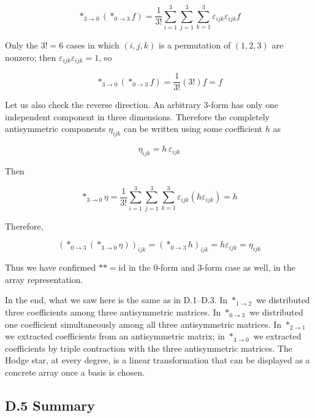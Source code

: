 \documentclass[a4paper,12pt,openany]{book}
\begin{document}
\[
\ast_{3\to0}(\ast_{0\to3}f)
=
\frac{1}{3!}
\sum_{i=1}^{3}
\sum_{j=1}^{3}
\sum_{k=1}^{3}
\varepsilon_{ijk}\varepsilon_{ijk}f
\]

Only the \(3!=6\) cases in which \((i,j,k)\) is a permutation of
\((1,2,3)\) are nonzero; then \(\varepsilon_{ijk}\varepsilon_{ijk}=1\),
so

\[
\ast_{3\to0}(\ast_{0\to3}f)
=
\frac{1}{3!}(3!)f
=
f
\]

Let us also check the reverse direction. An arbitrary \(3\)-form has
only one independent component in three dimensions. Therefore the
completely antisymmetric components \(\eta_{ijk}\) can be written using
some coefficient \(h\) as

\[
\eta_{ijk}
=
h\,\varepsilon_{ijk}
\]

Then

\[
\ast_{3\to0}\eta
=
\frac{1}{3!}
\sum_{i=1}^{3}
\sum_{j=1}^{3}
\sum_{k=1}^{3}
\varepsilon_{ijk}(h\varepsilon_{ijk})
=
h
\]

Therefore,

\[
(\ast_{0\to3}(\ast_{3\to0}\eta))_{ijk}
=
(\ast_{0\to3}h)_{ijk}
=
h\varepsilon_{ijk}
=
\eta_{ijk}
\]

Thus we have confirmed \(\ast\ast=\mathrm{id}\) in the \(0\)-form and
\(3\)-form case as well, in the array representation.

In the end, what we saw here is the same as in D.1–D.3. In
\(\ast_{1\to2}\) we distributed three coefficients among three
antisymmetric matrices. In \(\ast_{0\to3}\) we distributed one
coefficient simultaneously among all three antisymmetric matrices. In
\(\ast_{2\to1}\) we extracted coefficients from an antisymmetric matrix;
in \(\ast_{3\to0}\) we extracted coefficients by triple contraction with
the three antisymmetric matrices. The Hodge star, at every degree, is a
linear transformation that can be displayed as a concrete array once a
basis is chosen.

\hypertarget{d.5-summary}{%
\subsection*{D.5 Summary}\label{d.5-summary}}
\end{document}
